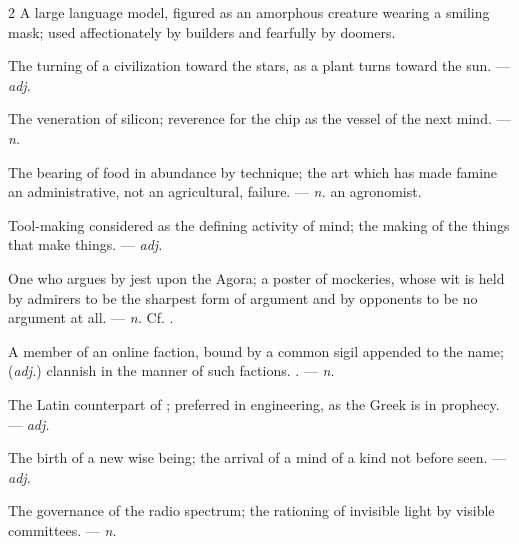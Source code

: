 \begin{multicols}{2}
  A large language model, figured as an amorphous creature wearing a smiling mask; used affectionately by builders and fearfully by doomers.

 The turning of a civilization toward the stars, as a plant turns toward the sun. —  \textit{adj.}

 The veneration of silicon; reverence for the chip as the vessel of the next mind. —  \textit{n.}

 The bearing of food in abundance by technique; the art which has made famine an administrative, not an agricultural, failure. —  \textit{n.} an agronomist.

 Tool-making considered as the defining activity of mind; the making of the things that make things. —  \textit{adj.}

 One who argues by jest upon the Agora; a poster of mockeries, whose wit is held by admirers to be the sharpest form of argument and by opponents to be no argument at all.   —  \textit{n.} Cf. .

 A member of an online faction, bound by a common sigil appended to the name; (\textit{adj.}) clannish in the manner of such factions. . —  \textit{n.}

 The Latin counterpart of ; preferred in engineering, as the Greek is in prophecy. —  \textit{adj.}

 The birth of a new wise being; the arrival of a mind of a kind not before seen. —  \textit{adj.}

 The governance of the radio spectrum; the rationing of invisible light by visible committees. —  \textit{n.}


\end{multicols}
